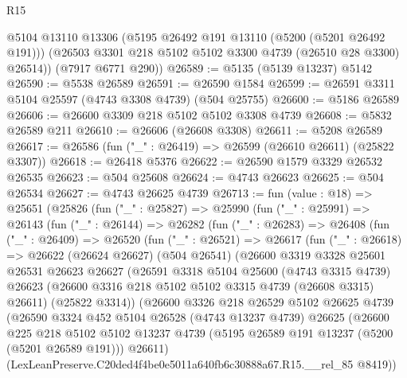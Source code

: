 \begin{lexlean}{R15}
\begin{coremodule}
{{{{{{{{{{{        @5104
        @13110
        @13306
        (@5195 @26492 @191 @13110 (@5200 (@5201 @26492 @191)))
        (@26503 @3301 @218 @5102 @5102 @3300 @4739 (@26510 @28 @3300) @26514))
      (@7917 @6771 @290))
@26589 := @5135 (@5139 @13237) @5142
@26590 := @5538 @26589
@26591 := @26590 @1584
@26599 := @26591 @3311 @5104 @25597 (@4743 @3308 @4739) (@504 @25755)
@26600 := @5186 @26589
@26606 := @26600 @3309 @218 @5102 @5102 @3308 @4739
@26608 := @5832 @26589 @211
@26610 := @26606 (@26608 @3308)
@26611 := @5208 @26589
@26617 := @26586 (fun ("_" : @26419) => @26599 (@26610 @26611) (@25822 @3307))
@26618 := @26418 @5376
@26622 := @26590 @1579 @3329 @26532 @26535
@26623 := @504 @25608
@26624 := @4743 @26623
@26625 := @504 @26534
@26627 := @4743 @26625 @4739
@26713 := fun (value : @18) =>
  @25651
    (@25826
      (fun ("_" : @25827) =>
      @25990
        (fun ("_" : @25991) =>
        @26143
          (fun ("_" : @26144) =>
          @26282
            (fun ("_" : @26283) =>
            @26408
              (fun ("_" : @26409) =>
              @26520
                (fun ("_" : @26521) =>
                @26617
                  (fun ("_" : @26618) =>
                  @26622
                    (@26624 @26627)
                    (@504 @26541)
                    (@26600
                      @3319
                      @3328
                      @25601
                      @26531
                      @26623
                      @26627
                      (@26591
                        @3318
                        @5104
                        @25600
                        (@4743 @3315 @4739)
                        @26623
                        (@26600 @3316 @218 @5102 @5102 @3315 @4739 (@26608 @3315) @26611)
                        (@25822 @3314))
                      (@26600
                        @3326
                        @218
                        @26529
                        @5102
                        @26625
                        @4739
                        (@26590
                          @3324
                          @452
                          @5104
                          @26528
                          (@4743 @13237 @4739)
                          @26625
                          (@26600
                            @225
                            @218
                            @5102
                            @5102
                            @13237
                            @4739
                            (@5195 @26589 @191 @13237 (@5200 (@5201 @26589 @191)))
                            @26611)
                          (LexLeanPreserve.C20ded4f4be0e5011a640fb6c30888a67.R15.__rel_85 @8419))
}}}}}}}}}}}
\end{coremodule}
\end{lexlean}
